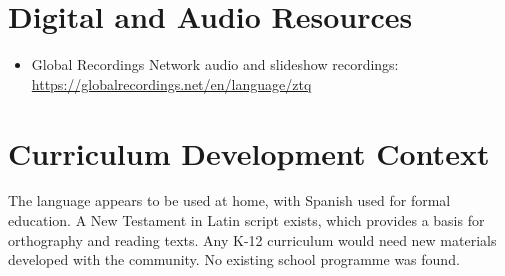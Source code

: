 \documentclass[12pt]{article}
\begin{document}
\section{Digital and Audio Resources}
\begin{itemize}
\item Global Recordings Network audio and slideshow recordings: \url{https://globalrecordings.net/en/language/ztq}
\end{itemize}

\section{Curriculum Development Context}
The language appears to be used at home, with Spanish used for formal education. A New Testament in Latin script exists, which provides a basis for orthography and reading texts. Any K-12 curriculum would need new materials developed with the community. No existing school programme was found.
\end{document}
